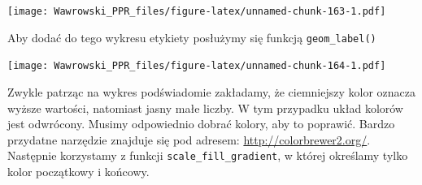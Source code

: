 \documentclass[]{book}
\newenvironment{Shaded}{\begin{snugshade}}{\end{snugshade}}
\newcommand{\KeywordTok}[1]{\textcolor[rgb]{0.13,0.29,0.53}{\textbf{#1}}}
\newcommand{\DataTypeTok}[1]{\textcolor[rgb]{0.13,0.29,0.53}{#1}}
\newcommand{\StringTok}[1]{\textcolor[rgb]{0.31,0.60,0.02}{#1}}
\newcommand{\OperatorTok}[1]{\textcolor[rgb]{0.81,0.36,0.00}{\textbf{#1}}}
\newcommand{\NormalTok}[1]{#1}
\begin{document}
\texttt{[image: Wawrowski\_PPR\_files/figure-latex/unnamed-chunk-163-1.pdf]}

Aby dodać do tego wykresu etykiety posłużymy się funkcją
\texttt{geom\_label()}

\begin{Shaded}
\end{Shaded}

\texttt{[image: Wawrowski\_PPR\_files/figure-latex/unnamed-chunk-164-1.pdf]}

Zwykle patrząc na wykres podświadomie zakładamy, że ciemniejszy kolor
oznacza wyższe wartości, natomiast jasny małe liczby. W tym przypadku
układ kolorów jest odwrócony. Musimy odpowiednio dobrać kolory, aby to
poprawić. Bardzo przydatne narzędzie znajduje się pod adresem:
\url{http://colorbrewer2.org/}. Następnie korzystamy z funkcji
\texttt{scale\_fill\_gradient}, w której określamy tylko kolor
początkowy i końcowy.

\begin{Shaded}
\end{Shaded}
\end{document}
